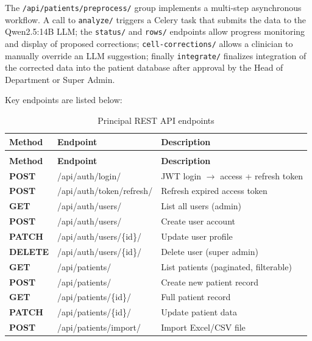\documentclass[12pt,a4paper,twoside]{report}
\begin{document}
The \texttt{/api/patients/preprocess/} group implements a multi-step asynchronous workflow. A call to \texttt{analyze/} triggers a Celery task that submits the data to the Qwen2.5:14B LLM; the \texttt{status/} and \texttt{rows/} endpoints allow progress monitoring and display of proposed corrections; \texttt{cell-corrections/} allows a clinician to manually override an LLM suggestion; finally \texttt{integrate/} finalizes integration of the corrected data into the patient database after approval by the Head of Department or Super Admin.

Key endpoints are listed below:

\begin{longtable}{@{}
  >{\bfseries\footnotesize}p{1.3cm}
  >{\footnotesize\ttfamily\raggedright\arraybackslash}p{6.8cm}
  >{\footnotesize\raggedright\arraybackslash}p{5.5cm}@{}}
\caption{Principal REST API endpoints}\label{tab:api_endpoints}\\
\toprule
\textbf{Method} & \textbf{Endpoint} & \textbf{Description} \\
\midrule
\endfirsthead
\multicolumn{3}{c}{\tablename\ \thetable\ (continued)}\\
\toprule\textbf{Method} & \textbf{Endpoint} & \textbf{Description}\\\midrule
\endhead
\bottomrule
\endlastfoot
POST   & /api/auth/login/                           & JWT login $\rightarrow$ access + refresh token \\
POST   & /api/auth/token/refresh/                   & Refresh expired access token \\
GET    & /api/auth/users/                    & List all users (admin) \\
POST   & /api/auth/users/                    & Create user account \\
PATCH  & /api/auth/users/\{id\}/             & Update user profile \\
DELETE & /api/auth/users/\{id\}/             & Delete user (super admin) \\
GET    & /api/patients/                             & List patients (paginated, filterable) \\
POST   & /api/patients/                             & Create new patient record \\
GET    & /api/patients/\{id\}/                      & Full patient record \\
PATCH  & /api/patients/\{id\}/                      & Update patient data \\
POST   & /api/patients/import/                      & Import Excel/CSV file \\

\end{longtable}
\end{document}
